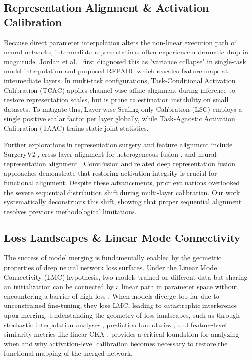 \documentclass{article}
\theoremstyle{plain}
\theoremstyle{definition}
\theoremstyle{remark}
\begin{document}
\subsection{Representation Alignment \& Activation Calibration}
Because direct parameter interpolation alters the non-linear execution path of neural networks, intermediate representations often experience a dramatic drop in magnitude. Jordan et al.\ \cite{jordan2022repair} first diagnosed this as "variance collapse" in single-task model interpolation and proposed REPAIR, which rescales feature maps at intermediate layers. In multi-task configurations, Task-Conditional Activation Calibration (TCAC) \cite{tcac2026} applies channel-wise affine alignment during inference to restore representation scales, but is prone to estimation instability on small datasets. To mitigate this, Layer-wise Scaling-only Calibration (LSC) \cite{lsc2026} employs a single positive scalar factor per layer globally, while Task-Agnostic Activation Calibration (TAAC) \cite{taac2026} trains static joint statistics. 

Further explorations in representation surgery and feature alignment include SurgeryV2 \cite{yang2024surgeryv2}, cross-layer alignment for heterogeneous fusion \cite{nguyen2021crosslayer}, and neural representation alignment \cite{imani2021representation, takahashi2025investigating, hong2025adaptive, wald2024decoupling}. ConvFusion \cite{waeijen2021convfusion} and related deep representation fusion approaches \cite{aldahoul2021model, cao2024deep, moralesbrotons2024exponential} demonstrate that restoring activation integrity is crucial for functional alignment. Despite these advancements, prior evaluations overlooked the severe sequential distribution shift during multi-layer calibration. Our work systematically deconstructs this shift, showing that proper sequential alignment resolves previous methodological limitations.

\subsection{Loss Landscapes \& Linear Mode Connectivity}
The success of model merging is fundamentally enabled by the geometric properties of deep neural network loss surfaces. Under the Linear Mode Connectivity (LMC) hypothesis, two models trained on different data but sharing an initialization can be connected by a linear path in parameter space without encountering a barrier of high loss \cite{nikishin2018improving, akash2022wasserstein, khan2024sok}. When models diverge too far due to unconstrained fine-tuning, they lose LMC, leading to catastrophic interference upon merging. Understanding the geometry of loss landscapes, such as through stochastic interpolation analyses \cite{guo2022stochastic}, prediction boundaries \cite{jin2018prediction}, and feature-level similarity metrics like linear CKA \cite{kornblith2019similarity, meng2021analysis}, provides a critical foundation for analyzing when and why activation-level calibration becomes necessary to restore the functional mapping of the merged network.
\end{document}
